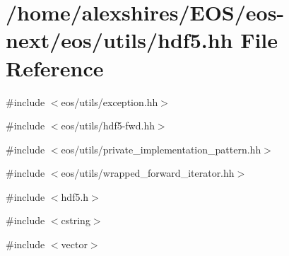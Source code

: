 \hypertarget{hdf5_8hh}{
\section{/home/alexshires/EOS/eos-\/next/eos/utils/hdf5.hh File Reference}
\label{hdf5_8hh}
}
{\ttfamily \#include $<$eos/utils/exception.hh$>$}\par
{\ttfamily \#include $<$eos/utils/hdf5-\/fwd.hh$>$}\par
{\ttfamily \#include $<$eos/utils/private\_\-implementation\_\-pattern.hh$>$}\par
{\ttfamily \#include $<$eos/utils/wrapped\_\-forward\_\-iterator.hh$>$}\par
{\ttfamily \#include $<$hdf5.h$>$}\par
{\ttfamily \#include $<$cstring$>$}\par
{\ttfamily \#include $<$vector$>$}\par
